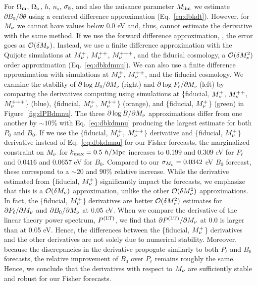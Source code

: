 For $\Omega_{\rm m}$, $\Omega_{\rm b}$, $h$, $n_s$, $\sigma_8$, and also the nuisance parameter $M_{\rm lim}$ 
we estimate $\partial B_0/\partial \theta$ using a centered difference approximation 
(Eq.~\ref{eq:dbkdt}). However, for $M_\nu$ we cannot have values below 0.0 eV 
and, thus, cannot estimate the derivative with the same method. If we use the 
forward difference approximation, 
\beq 
{} \approx {}, 
\eeq
the error goes as $\mathcal{O}(\delta M_\nu)$. Instead, we use a finite difference
approximation with the Quijote simulations at $M_\nu^{+}$, $M_\nu^{++}$, $M_\nu^{+++}$, 
and the fiducial cosmology, a $\mathcal{O}(\delta M_\nu^2)$ order approximation 
(Eq.~\ref{eq:dbkdmnu}). We can also use a finite difference approximation with 
simulations at $M_\nu^{+}$, $M_\nu^{++}$, and the fiducial cosmology. We examine
the stability of $\partial \log B_0/\partial M_\nu$ (right) and 
$\partial \log P_\ell/\partial M_\nu$ (left) by comparing the derivatives computing
using simulations at \{fiducial, $M_\nu^{+}$, $M_\nu^{++}$, $M_\nu^{+++}$\} (blue), 
\{fiducial, $M_\nu^{+}$, $M_\nu^{++}$\} (orange), and \{fiducial, $M_\nu^{+}$\} 
(green) in Figure~\ref{fig:dPBdmnu}. The three $\partial \log B/\partial M_\nu$
approximations differ from one another by $\sim10\%$ with Eq.~\ref{eq:dbkdmnu} 
producing the largest estimate for both $P_0$ and $B_0$. If we use the
\{fiducial, $M_\nu^{+}$, $M_\nu^{++}$\} derivative and \{fiducial, $M_\nu^{+}$\} derivative 
instead of Eq.~\ref{eq:dbkdmnu} for our Fisher forecasts, the marginalized constraint on
$M_\nu$ for $k_{\rm max} = 0.5~h/{\rm Mpc}$ increases to $0.199$ and $0.309$ eV for $P_\ell$ 
and $0.0416$ and $0.0657$ eV for $B_0$. Compared to our $\sigma_{M_\nu} = 0.0342$ eV 
$B_0$ forecast, these correspond to a $\sim20$ and $90\%$ relative increase. 
While the derivative estimated from \{fiducial, $M_\nu^{+}$\} significantly impact 
the forecasts, we emphasize that this is a $\mathcal{O}(\delta M_\nu)$ approximation, 
unlike the other $\mathcal{O}(\delta M_\nu^2)$ approximations. In fact, the 
\{fiducial, $M_\nu^{+}$\} derivatives are better $\mathcal{O}(\delta M_\nu^2)$ estimates
for $\partial P_\ell/\partial M_\nu$ and $\partial B_0/\partial M_\nu$ at 0.05 eV. When we 
compare the derivative of the linear theory power spectrum, $P^{(\rm LT)}$, we find 
that $\partial P^{(\rm LT)}/\partial M_\nu$ at 0.0 is larger than at 0.05 eV. Hence, 
the differences between the \{fiducial, $M_\nu^{+}$\} derivatives and the other 
derivatives are not solely due to numerical stability. Moreover, because the 
discrepancies in the derivative propogate similarly to both $P_\ell$ and $B_0$ forecasts, 
the relative improvement of $B_0$ over $P_\ell$ remains roughly the same.
Hence, we conclude that the derivatives with respect to $M_\nu$ are sufficiently 
stable and robust for our Fisher forecasts.

